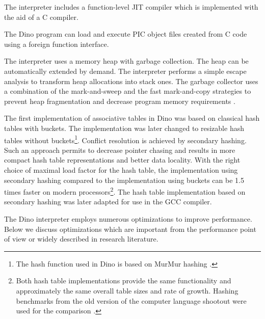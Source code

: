 \documentclass[preprint]{sigplanconf}
\begin{document}
  The interpreter includes a function-level JIT compiler which is implemented
with the aid of a C compiler.

  The Dino program can load and execute PIC object files created from
C code using a foreign function interface.

  The interpreter uses a memory heap with garbage collection.  The
heap can be automatically extended by demand.  The interpreter performs a
simple escape analysis to transform heap allocations into stack ones.
The garbage collector uses a combination
of the mark-and-sweep and the fast mark-and-copy strategies
to prevent heap fragmentation and
decrease program memory requirements \cite{GCH}.

  The first implementation of associative tables in Dino was based on classical hash
tables with buckets.  The implementation was later changed to
resizable hash tables without buckets\footnote{The hash function used in Dino is based on MurMur hashing \cite{Appleby}.}. %
Conflict resolution is
achieved by secondary hashing.  Such an approach permits to decrease
pointer chasing and results in more compact hash table
representations and better data locality.
With the right choice
of maximal load factor
for the hash table, the implementation using secondary hashing compared to the implementation using
buckets can be 1.5 times faster on modern processors\footnote{Both hash table implementations provide the same
  functionality and approximately the same overall table sizes and
  rate of growth.
  Hashing benchmarks from the old version of the computer language
  shootout were used for the comparison \cite{Benchmarks}.}.
The hash table implementation based on secondary hashing was later adapted for use in the GCC compiler.

   The Dino interpreter employs numerous optimizations to improve performance.
Below we discuss optimizations which are important from the performance point of view
or widely described in research literature.
\end{document}
